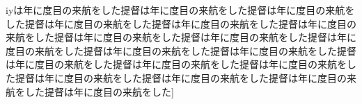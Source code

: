 \documentclass[luatex,fontsize=8pt,paper=b5,twoside,report]{jlreq}%
\begin{document}
i{y\phantom{y}}は年に度目の来航をした提督は年に度目の来航をした提督は年に度目の来航をした提督は年に度目の来航をした提督は年に度目の来航をした提督は年に度目の来航をした提督は年に度目の来航をした提督は年に度目の来航をした提督は年に度目の来航をした提督は年に度目の来航をした提督は年に度目の来航をした提督は年に度目の来航をした提督は年に度目の来航をした提督は年に度目の来航をした提督は年に度目の来航をした提督は年に度目の来航をした提督は年に度目の来航をした提督は年に度目の来航をした]
\end{document}

